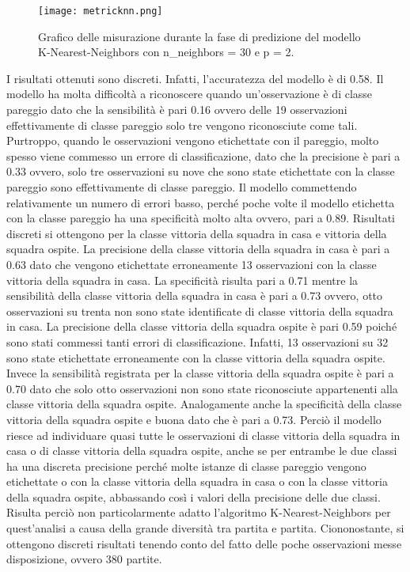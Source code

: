 \begin{figure}[h]
	\begin{center}
		\texttt{[image: metricknn.png]}
		\caption{Grafico delle misurazione durante la fase di predizione del modello K-Nearest-Neighbors con n\_neighbors = 30 e p = 2.
		} 
		\label{fig:knnmetrics}
	\end{center}
\end{figure}
I risultati ottenuti sono discreti. Infatti, l'accuratezza del modello è di 0.58. Il modello ha molta difficoltà a riconoscere quando un’osservazione è di classe pareggio dato che la sensibilità è pari 0.16 ovvero delle 19 osservazioni effettivamente di classe pareggio solo tre vengono riconosciute come tali. Purtroppo, quando le osservazioni vengono etichettate con il pareggio, molto spesso viene commesso un errore di classificazione, dato che la precisione è pari a 0.33 ovvero, solo tre osservazioni su nove che sono state etichettate con la classe pareggio sono effettivamente di classe pareggio. Il modello commettendo relativamente un numero di errori basso, perché poche volte il modello etichetta con la classe pareggio ha una specificità molto alta ovvero, pari a 0.89. Risultati discreti si ottengono per la classe vittoria della squadra in casa e vittoria della squadra ospite. La precisione della classe vittoria della squadra in casa è pari a 0.63 dato che vengono etichettate erroneamente 13 osservazioni con la classe vittoria della squadra in casa. La specificità risulta pari a 0.71 mentre la sensibilità della classe vittoria della squadra in casa è pari a 0.73 ovvero, otto osservazioni su trenta non sono state identificate di classe vittoria della squadra in casa. La precisione della classe vittoria della squadra ospite è pari 0.59 poiché sono stati commessi tanti errori di classificazione. Infatti, 13 osservazioni su 32 sono state etichettate erroneamente con la classe vittoria della squadra ospite. Invece la sensibilità registrata per la classe vittoria della squadra ospite è pari a 0.70 dato che solo otto osservazioni non sono state riconosciute appartenenti alla classe vittoria della squadra ospite. Analogamente anche la specificità della classe vittoria della squadra ospite e buona dato che è pari a 0.73. Perciò il modello riesce ad individuare quasi tutte le osservazioni di classe vittoria della squadra in casa o di classe vittoria della squadra ospite, anche se per entrambe le due classi ha una discreta precisione perché molte istanze di classe pareggio vengono etichettate o con la classe vittoria della squadra in casa o con la classe vittoria della squadra ospite, abbassando così i valori della precisione delle due classi.\\
Risulta perciò non particolarmente adatto l'algoritmo K-Nearest-Neighbors per quest'analisi a causa della grande diversità tra partita e partita. Ciononostante, si ottengono discreti risultati tenendo conto del fatto delle poche osservazioni messe disposizione, ovvero 380 partite.
